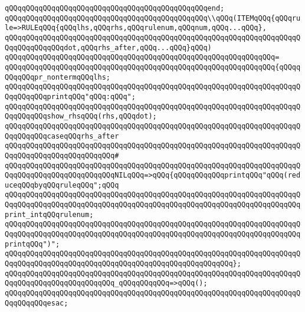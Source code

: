 \verb|qQQqqQQqqQQqqQQqqQQqqQQqqQQqqQQqqQQqqQQqqQQqqQQqend;|\newline
\newline
\verb|qQQqqQQqqQQqqQQqqQQqqQQqqQQqqQQqqQQqqQQqqQQqqQQq\\qQQq(ITEMqQQq{qQQqrule=>RULEqQQq{qQQqlhs,qQQqrhs,qQQqrulenum,qQQqnum,qQQq...qQQq},|\newline
\verb|qQQqqQQqqQQqqQQqqQQqqQQqqQQqqQQqqQQqqQQqqQQqqQQqqQQqqQQqqQQqqQQqqQQqqQQqqQQqqQQqqQQqdot,qQQqrhs_after,qQQq...qQQq}qQQq)|\newline
\verb|qQQqqQQqqQQqqQQqqQQqqQQqqQQqqQQqqQQqqQQqqQQqqQQqqQQqqQQqqQQqqQQq=|\newline
\verb|qQQqqQQqqQQqqQQqqQQqqQQqqQQqqQQqqQQqqQQqqQQqqQQqqQQqqQQqqQQqqQQq{qQQqqQQqqQQqpr_nontermqQQqlhs;|\newline
\verb|qQQqqQQqqQQqqQQqqQQqqQQqqQQqqQQqqQQqqQQqqQQqqQQqqQQqqQQqqQQqqQQqqQQqqQQqqQQqqQQqprintqQQq"qQQq:qQQq";|\newline
\verb|qQQqqQQqqQQqqQQqqQQqqQQqqQQqqQQqqQQqqQQqqQQqqQQqqQQqqQQqqQQqqQQqqQQqqQQqqQQqqQQqshow_rhsqQQq(rhs,qQQqdot);|\newline
\newline
\verb|qQQqqQQqqQQqqQQqqQQqqQQqqQQqqQQqqQQqqQQqqQQqqQQqqQQqqQQqqQQqqQQqqQQqqQQqqQQqqQQqcaseqQQqrhs_after|\newline
\verb|qQQqqQQqqQQqqQQqqQQqqQQqqQQqqQQqqQQqqQQqqQQqqQQqqQQqqQQqqQQqqQQqqQQqqQQqqQQqqQQqqQQqqQQqqQQqqQQq#|\newline
\verb|qQQqqQQqqQQqqQQqqQQqqQQqqQQqqQQqqQQqqQQqqQQqqQQqqQQqqQQqqQQqqQQqqQQqqQQqqQQqqQQqqQQqqQQqqQQqqQQqNILqQQq=>qQQq{qQQqqQQqqQQqprintqQQq"qQQq(reduceqQQqbyqQQqruleqQQq";qQQq|\newline
\verb|qQQqqQQqqQQqqQQqqQQqqQQqqQQqqQQqqQQqqQQqqQQqqQQqqQQqqQQqqQQqqQQqqQQqqQQqqQQqqQQqqQQqqQQqqQQqqQQqqQQqqQQqqQQqqQQqqQQqqQQqqQQqqQQqqQQqqQQqqQQqprint_intqQQqrulenum;|\newline
\verb|qQQqqQQqqQQqqQQqqQQqqQQqqQQqqQQqqQQqqQQqqQQqqQQqqQQqqQQqqQQqqQQqqQQqqQQqqQQqqQQqqQQqqQQqqQQqqQQqqQQqqQQqqQQqqQQqqQQqqQQqqQQqqQQqqQQqqQQqqQQqprintqQQq")";|\newline
\verb|qQQqqQQqqQQqqQQqqQQqqQQqqQQqqQQqqQQqqQQqqQQqqQQqqQQqqQQqqQQqqQQqqQQqqQQqqQQqqQQqqQQqqQQqqQQqqQQqqQQqqQQqqQQqqQQqqQQqqQQqqQQq};|\newline
\newline
\verb|qQQqqQQqqQQqqQQqqQQqqQQqqQQqqQQqqQQqqQQqqQQqqQQqqQQqqQQqqQQqqQQqqQQqqQQqqQQqqQQqqQQqqQQqqQQqqQQq_qQQqqQQqqQQq=>qQQq();|\newline
\verb|qQQqqQQqqQQqqQQqqQQqqQQqqQQqqQQqqQQqqQQqqQQqqQQqqQQqqQQqqQQqqQQqqQQqqQQqqQQqqQQqesac;|\newline
